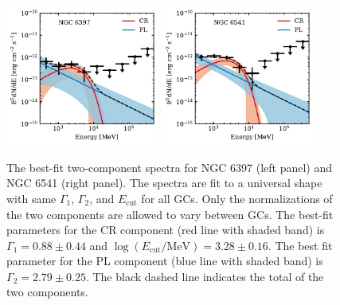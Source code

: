 \documentclass[doublespace,nopageskip]{VTthesis} %
\begin{document}
\begin{figure}[htb]
    \centering
    \includegraphics[width=0.45\textwidth]{Figures/Globular/spectra/2comp_16.pdf}
    \includegraphics[width=0.45\textwidth]{Figures/Globular/spectra/2comp_21.pdf}
    \caption{The best-fit two-component spectra for NGC 6397 (left panel) and NGC 6541 (right panel). The spectra are fit to a universal shape with same $\Gamma_1$, $\Gamma_2$, and $E_\mathrm{cut}$ for all GCs.  Only the normalizations of the two components are allowed to vary between GCs. The best-fit parameters for the CR component (red line with shaded band) is $\Gamma_1 = 0.88 \pm 0.44$ and $\log(E_\mathrm{cut}/\mathrm{MeV})=3.28 \pm 0.16$. The best fit parameter for the {PL} component (blue line with shaded band) is $\Gamma_2 = 2.79 \pm 0.25$. The black dashed line indicates the total of the two components.}
    \label{fig:global_spectra}
\end{figure}
\end{document}
